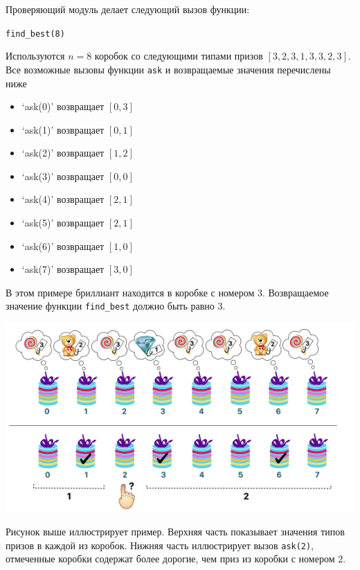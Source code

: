 Проверяющий модуль делает следующий вызов функции:

\texttt{find\_best(8)}

Используются $n = 8$ коробок со следующими типами призов $[3,2,3,1,3,3,2,3]$. Все
возможные вызовы функции \texttt{ask} и возвращаемые значения перечислены ниже

\begin{itemize}
\item `ask(0)' возвращает $[0, 3]$
\item `ask(1)' возвращает $[0, 1]$
\item `ask(2)' возвращает $[1, 2]$
\item `ask(3)' возвращает $[0, 0]$
\item `ask(4)' возвращает $[2, 1]$
\item `ask(5)' возвращает $[2, 1]$
\item `ask(6)' возвращает $[1, 0]$
\item `ask(7)' возвращает $[3, 0]$
\end{itemize}

В этом примере бриллиант находится в коробке с номером $3$. Возвращаемое значение
функции \texttt{find\_best} должно быть равно $3$.

\includegraphics{prize.png} 

Рисунок выше иллюстрирует пример. Верхняя часть показывает значения типов призов в
каждой из коробок. Нижняя часть иллюстрирует вызов \texttt{ask(2)}, отмеченные коробки содержат более дорогие, чем приз из коробки с номером $2$.